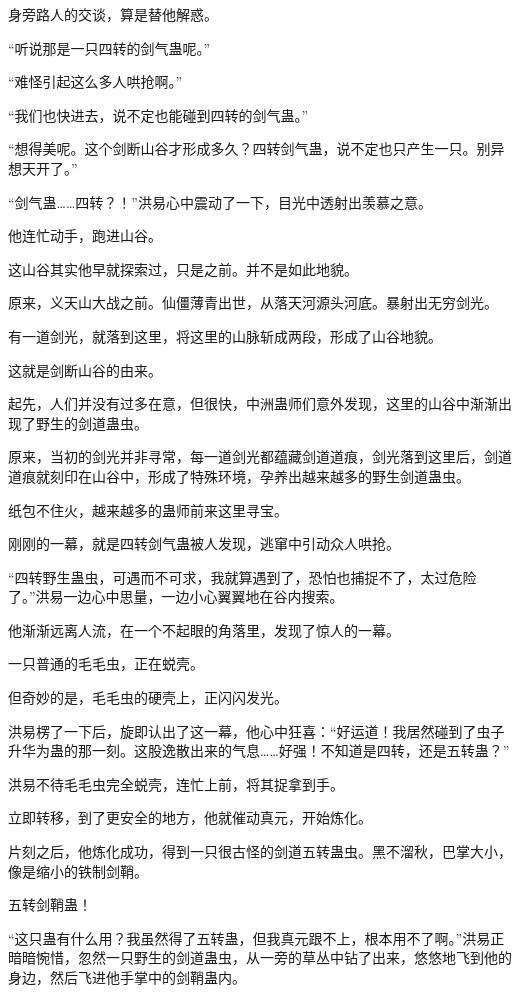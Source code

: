 \begin{this_body}
身旁路人的交谈，算是替他解惑。

“听说那是一只四转的剑气蛊呢。”

“难怪引起这么多人哄抢啊。”

“我们也快进去，说不定也能碰到四转的剑气蛊。”

“想得美呢。这个剑断山谷才形成多久？四转剑气蛊，说不定也只产生一只。别异想天开了。”

“剑气蛊……四转？！”洪易心中震动了一下，目光中透射出羡慕之意。

他连忙动手，跑进山谷。

这山谷其实他早就探索过，只是之前。并不是如此地貌。

原来，义天山大战之前。仙僵薄青出世，从落天河源头河底。暴射出无穷剑光。

有一道剑光，就落到这里，将这里的山脉斩成两段，形成了山谷地貌。

这就是剑断山谷的由来。

起先，人们并没有过多在意，但很快，中洲蛊师们意外发现，这里的山谷中渐渐出现了野生的剑道蛊虫。

原来，当初的剑光并非寻常，每一道剑光都蕴藏剑道道痕，剑光落到这里后，剑道道痕就刻印在山谷中，形成了特殊环境，孕养出越来越多的野生剑道蛊虫。

纸包不住火，越来越多的蛊师前来这里寻宝。

刚刚的一幕，就是四转剑气蛊被人发现，逃窜中引动众人哄抢。

“四转野生蛊虫，可遇而不可求，我就算遇到了，恐怕也捕捉不了，太过危险了。”洪易一边心中思量，一边小心翼翼地在谷内搜索。

他渐渐远离人流，在一个不起眼的角落里，发现了惊人的一幕。

一只普通的毛毛虫，正在蜕壳。

但奇妙的是，毛毛虫的硬壳上，正闪闪发光。

洪易楞了一下后，旋即认出了这一幕，他心中狂喜：“好运道！我居然碰到了虫子升华为蛊的那一刻。这股逸散出来的气息……好强！不知道是四转，还是五转蛊？”

洪易不待毛毛虫完全蜕壳，连忙上前，将其捉拿到手。

立即转移，到了更安全的地方，他就催动真元，开始炼化。

片刻之后，他炼化成功，得到一只很古怪的剑道五转蛊虫。黑不溜秋，巴掌大小，像是缩小的铁制剑鞘。

五转剑鞘蛊！

“这只蛊有什么用？我虽然得了五转蛊，但我真元跟不上，根本用不了啊。”洪易正暗暗惋惜，忽然一只野生的剑道蛊虫，从一旁的草丛中钻了出来，悠悠地飞到他的身边，然后飞进他手掌中的剑鞘蛊内。


\end{this_body}
